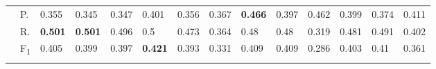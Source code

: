 \begin{tabularx}{\hsize}{p{1.3em}l Z  Z  Z  Z  Z  Z  Z  Z  Z  Z  Z  Z }
    & P.    & 0.355    & 0.345    & 0.347    & 0.401    & 0.356    & 0.367    & \textbf{ 0.466 }    & 0.397    & 0.462    & 0.399    & 0.374    & 0.411 \\
    & R.    & \textbf{ 0.501 }    & \textbf{ 0.501 }    & 0.496    & 0.5    & 0.473    & 0.364    & 0.48    & 0.48    & 0.319    & 0.481    & 0.491    & 0.402 \\
    & F\textsubscript{1}    & 0.405    & 0.399    & 0.397    & \textbf{ 0.421 }    & 0.393    & 0.331    & 0.409    & 0.409    & 0.286    & 0.403    & 0.41    & 0.361 \\
     \midrule {}

\end{tabularx}